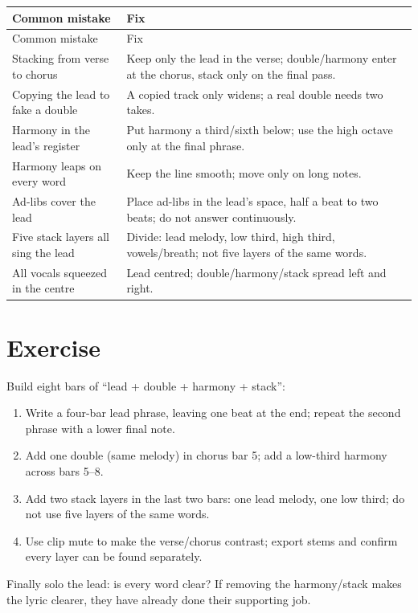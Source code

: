 \begin{longtable}{p{}p{}}
\toprule
Common mistake & Fix \\
\midrule
\endfirsthead
\toprule
Common mistake & Fix \\
\midrule
\endhead
Stacking from verse to chorus & Keep only the lead in the verse; double/harmony enter at the chorus, stack only on the final pass. \\
Copying the lead to fake a double & A copied track only widens; a real double needs two takes. \\
Harmony in the lead's register & Put harmony a third/sixth below; use the high octave only at the final phrase. \\
Harmony leaps on every word & Keep the line smooth; move only on long notes. \\
Ad-libs cover the lead & Place ad-libs in the lead's space, half a beat to two beats; do not answer continuously. \\
Five stack layers all sing the lead & Divide: lead melody, low third, high third, vowels/breath; not five layers of the same words. \\
All vocals squeezed in the centre & Lead centred; double/harmony/stack spread left and right. \\
\bottomrule
\end{longtable}

\section{Exercise}
\label{sec:vocal-exercise}

\begin{exercise}
Build eight bars of ``lead + double + harmony + stack'':
\begin{enumerate}
\item Write a four-bar lead phrase, leaving one beat at the end; repeat the second phrase with a lower final note.
\item Add one double (same melody) in chorus bar 5; add a low-third harmony across bars 5--8.
\item Add two stack layers in the last two bars: one lead melody, one low third; do not use five layers of the same words.
\item Use clip mute to make the verse/chorus contrast; export stems and confirm every layer can be found separately.
\end{enumerate}
Finally solo the lead: is every word clear? If removing the harmony/stack makes the lyric clearer, they have already done their supporting job.
\end{exercise}

